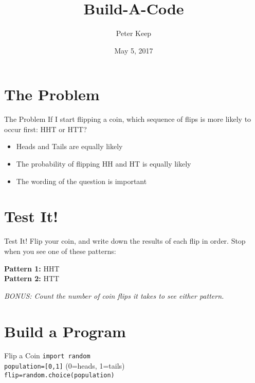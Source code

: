 \documentclass{beamer}
\title{Build-A-Code}
\subtitle{}
\date{May 5, 2017}
\author{Peter Keep}
\institute{Moraine Valley Community College}
\begin{document}
\maketitle
\section{The Problem}
\begin{frame}{The Problem}
If I start flipping a coin, which sequence of flips is more likely to occur first: HHT or HTT?\pause
\begin{itemize}
  \item Heads and Tails are equally likely \pause
  \item The probability of flipping HH and HT is equally likely \pause
  \item The wording of the question is important
\end{itemize}

\end{frame}

\section{Test It!}

\begin{frame}{Test It!}
Flip your coin, and write down the results of each flip in order. Stop when you see one of these patterns:

\textbf{Pattern 1:} HHT\\

\textbf{Pattern 2:} HTT\\\pause

\vspace{0.5cm}
\textit{BONUS: Count the number of coin flips it takes to see either pattern.}
\end{frame}


\section{Build a Program}



\begin{frame}{Flip a Coin}
\texttt{import random}\\
\texttt{population=[0,1]} (0=heads, 1=tails)\\
\texttt{flip=random.choice(population)}\\


\end{frame}
\end{document}
